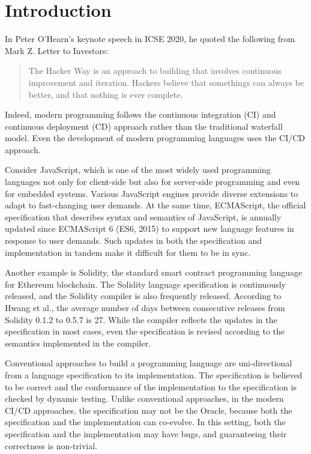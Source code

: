 \section{Introduction}\label{sec:intro}

In Peter O'Hearn's keynote speech in ICSE 2020, he quoted the following from
Mark Z. Letter to Investors:
\begin{quote}
  The Hacker Way is an approach to building that involves continuous improvement
  and iteration.  Hackers believe that somethings can always be better, and that
  nothing is ever complete.
\end{quote}
Indeed, modern programming follows the continuous integration (CI) and
continuous deployment (CD) approach rather than the traditional waterfall model.
Even the development of modern programming languages uses the CI/CD approach.

Consider JavaScript, which is one of the most widely used programming languages
not only for client-side but also for server-side programming\cite{nodejs} and
even for embedded systems\cite{moddable,espruino,tessel2}.  Various JavaScript
engines provide diverse extensions to adapt to fast-changing user demands.  At
the same time, ECMAScript, the official specification that describes syntax and
semantics of JavaScript, is annually updated since ECMAScript 6 (ES6,
2015)\cite{es6} to support new language features in response to user demands.
Such updates in both the specification and implementation in tandem make it
difficult for them to be in sync.

Another example is Solidity, the standard smart contract programming language
for Ethereum blockchain. The Solidity language specification is continuously
released, and the Solidity compiler is also frequently released.  According to
Hwang et al.\cite{solidity-gap}, the average number of days between consecutive
releases from Solidity 0.1.2 to 0.5.7 is 27. While the compiler reflects the
updates in the specification in most cases, even the specification is revised
according to the semantics implemented in the compiler.

Conventional approaches to build a programming language are uni-directional from
a language specification to its implementation. The specification is believed to
be correct and the conformance of the implementation to the specification is
checked by dynamic testing.  Unlike conventional approaches, in the modern CI/CD
approaches, the specification may not be the Oracle, because both the
specification and the implementation can co-evolve. In this setting, both the
specification and the implementation may have bugs, and guaranteeing their
correctness is non-trivial.

